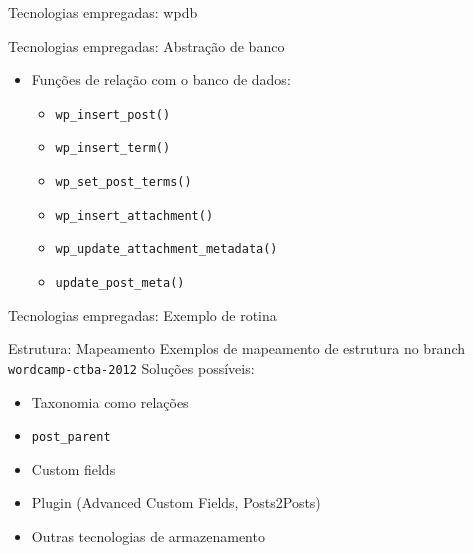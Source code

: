\documentclass[handout]{beamer}
\begin{document}
\begin{frame}{Tecnologias empregadas: wpdb}
  
\end{frame}

\begin{frame}{Tecnologias empregadas: Abstração de banco}
    \begin{itemize}
    \pause \item Funções de relação com o banco de dados:
    \begin{itemize}
      \pause \item \texttt{wp\_insert\_post()}
      \pause \item \texttt{wp\_insert\_term()}
      \pause \item \texttt{wp\_set\_post\_terms()}
      \pause \item \texttt{wp\_insert\_attachment()}
      \pause \item \texttt{wp\_update\_attachment\_metadata()}
      \pause \item \texttt{update\_post\_meta()}
    \end{itemize}
  \end{itemize}
\end{frame}

\begin{frame}{Tecnologias empregadas: Exemplo de rotina}
  
\end{frame}

\begin{frame}{Estrutura: Mapeamento}
  \pause Exemplos de mapeamento de estrutura no branch \texttt{wordcamp-ctba-2012}
  \pause Soluções possíveis:
  \begin{itemize}
    \item Taxonomia como relações
    \item \texttt{post\_parent}
    \item Custom fields
    \item Plugin (Advanced Custom Fields, Posts2Posts)
    \item Outras tecnologias de armazenamento
  \end{itemize}
\end{frame}
\end{document}
